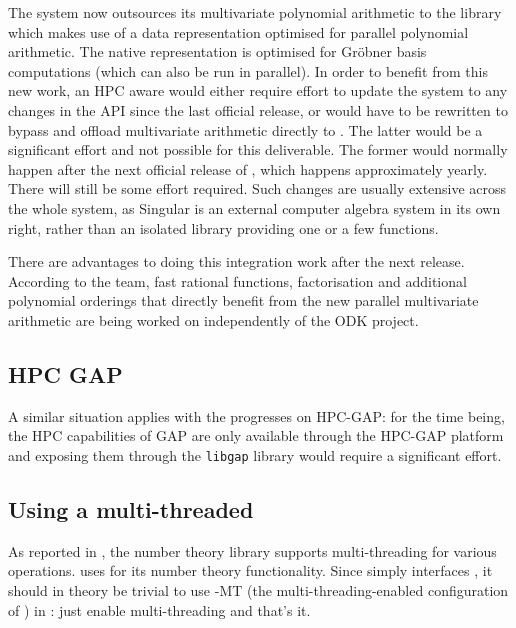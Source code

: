 \documentclass{deliverablereport}
\begin{document}
The \Singular system now outsources its multivariate polynomial arithmetic
to the \FLINT library which makes use of a data representation optimised
for parallel polynomial arithmetic. The native \Singular representation is optimised
for Gr\"{o}bner basis computations (which can also be run in parallel). In order to
benefit from this new work, an HPC aware \SageMath would either require effort to
update the \SageMath system to any changes in the \Singular API since the last
official \Singular release, or \SageMath would have to be rewritten to bypass \Singular
and offload multivariate arithmetic directly to \FLINT. The latter would be a significant
effort and not possible for this deliverable. The former would normally happen after
the next official release of \Singular, which happens approximately yearly. There will
still be some effort required.
Such changes are usually extensive across the whole system, as Singular is an external
computer algebra system in its own right, rather than an isolated library providing one
or a few functions.

There are advantages to doing this integration work after the next release. According
to the \Singular team, fast rational functions, factorisation and additional polynomial
orderings that directly benefit from the new parallel multivariate arithmetic are being
worked on independently of the ODK project.


\subsection{HPC GAP}

A similar situation applies with the progresses on HPC-GAP: for the time being,
the HPC capabilities of GAP are only available through the HPC-GAP platform and
exposing them through the \texttt{libgap} library would require a significant effort.

\subsection{Using a multi-threaded \Pari}

As reported in , the number theory library \Pari supports
multi-threading for various operations.
\Sage uses \Pari for its number theory functionality.
Since \Sage simply interfaces \Pari, it should in theory
be trivial to use \Pari-MT (the multi-threading-enabled configuration of \Pari) in \Sage:
just enable multi-threading and that's it.
\end{document}
